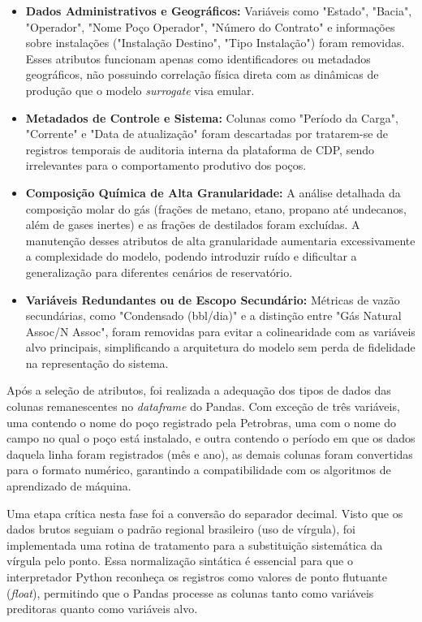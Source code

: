 \begin{itemize}
    \item \textbf{Dados Administrativos e Geográficos:} Variáveis como "Estado", "Bacia", "Operador", "Nome Poço Operador", "Número do Contrato" e informações sobre instalações ("Instalação Destino", "Tipo Instalação") foram removidas. Esses atributos funcionam apenas como identificadores ou metadados geográficos, não possuindo correlação física direta com as dinâmicas de produção que o modelo \textit{surrogate} visa emular.
    \item \textbf{Metadados de Controle e Sistema:} Colunas como "Período da Carga", "Corrente" e "Data de atualização" foram descartadas por tratarem-se de registros temporais de auditoria interna da plataforma de \gls{CDP}, sendo irrelevantes para o comportamento produtivo dos poços.
    \item \textbf{Composição Química de Alta Granularidade:} A análise detalhada da composição molar do gás (frações de metano, etano, propano até undecanos, além de gases inertes) e as frações de destilados foram excluídas. A manutenção desses atributos de alta granularidade aumentaria excessivamente a complexidade do modelo, podendo introduzir ruído e dificultar a generalização para diferentes cenários de reservatório.
    \item \textbf{Variáveis Redundantes ou de Escopo Secundário:} Métricas de vazão secundárias, como "Condensado (bbl/dia)" e a distinção entre "Gás Natural Assoc/N Assoc", foram removidas para evitar a colinearidade com as variáveis alvo principais, simplificando a arquitetura do modelo sem perda de fidelidade na representação do sistema.
\end{itemize}

Após a seleção de atributos, foi realizada a adequação dos tipos de dados das colunas remanescentes no \textit{dataframe} do Pandas. Com exceção de três variáveis, uma contendo o nome do poço registrado pela Petrobras, uma com o nome do campo no qual o poço está instalado, e outra contendo o período em que os dados daquela linha foram registrados (mês e ano), as demais colunas foram convertidas para o formato numérico, garantindo a compatibilidade com os algoritmos de aprendizado de máquina. 

Uma etapa crítica nesta fase foi a conversão do separador decimal. Visto que os dados brutos seguiam o padrão regional brasileiro (uso de vírgula), foi implementada uma rotina de tratamento para a substituição sistemática da vírgula pelo ponto. Essa normalização sintática é essencial para que o interpretador Python reconheça os registros como valores de ponto flutuante (\textit{float}), permitindo que o Pandas processe as colunas tanto como variáveis preditoras quanto como variáveis alvo.

